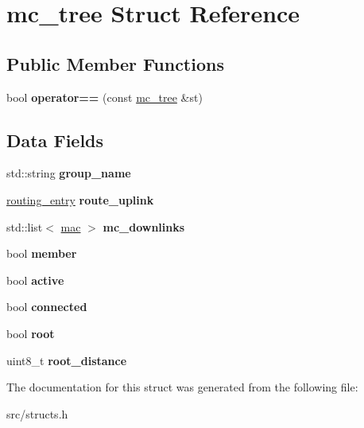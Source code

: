 \hypertarget{structmc__tree}{\section{mc\-\_\-tree Struct Reference}
\label{structmc__tree}
}
\subsection*{Public Member Functions}
\begin{DoxyCompactItemize}
\item 
\hypertarget{structmc__tree_a770847df89bb178f0c068c42ba9ccb92}{bool {\bfseries operator==} (const \hyperlink{structmc__tree}{mc\-\_\-tree} \&st)}\label{structmc__tree_a770847df89bb178f0c068c42ba9ccb92}

\end{DoxyCompactItemize}
\subsection*{Data Fields}
\begin{DoxyCompactItemize}
\item 
\hypertarget{structmc__tree_af8f1850c28b6de2912e78a96d4028a3f}{std\-::string {\bfseries group\-\_\-name}}\label{structmc__tree_af8f1850c28b6de2912e78a96d4028a3f}

\item 
\hypertarget{structmc__tree_a7492c75e3dcbf5fc3966770d681c79d8}{\hyperlink{structrouting__entry}{routing\-\_\-entry} {\bfseries route\-\_\-uplink}}\label{structmc__tree_a7492c75e3dcbf5fc3966770d681c79d8}

\item 
\hypertarget{structmc__tree_a84ebf022ad007b068e44cefe60954cbd}{std\-::list$<$ \hyperlink{structmac}{mac} $>$ {\bfseries mc\-\_\-downlinks}}\label{structmc__tree_a84ebf022ad007b068e44cefe60954cbd}

\item 
\hypertarget{structmc__tree_a749cfd1c4a02ae6c821e00e9d6f0d05f}{bool {\bfseries member}}\label{structmc__tree_a749cfd1c4a02ae6c821e00e9d6f0d05f}

\item 
\hypertarget{structmc__tree_a3755bba9d747bd106e687a17a2d9be62}{bool {\bfseries active}}\label{structmc__tree_a3755bba9d747bd106e687a17a2d9be62}

\item 
\hypertarget{structmc__tree_a9e19bc882182642a28a4c6c3a57d4726}{bool {\bfseries connected}}\label{structmc__tree_a9e19bc882182642a28a4c6c3a57d4726}

\item 
\hypertarget{structmc__tree_a605297a30634288a5944e4e11db9639c}{bool {\bfseries root}}\label{structmc__tree_a605297a30634288a5944e4e11db9639c}

\item 
\hypertarget{structmc__tree_ae373ff88ceba71b480fe58cdb4b2fbf2}{uint8\-\_\-t {\bfseries root\-\_\-distance}}\label{structmc__tree_ae373ff88ceba71b480fe58cdb4b2fbf2}

\end{DoxyCompactItemize}


The documentation for this struct was generated from the following file\-:\begin{DoxyCompactItemize}
\item 
src/structs.\-h\end{DoxyCompactItemize}
